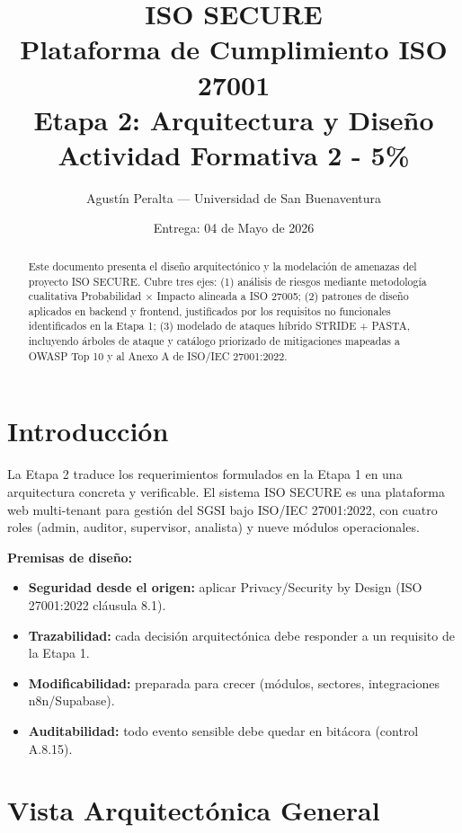 \documentclass[12pt,a4paper,oneside]{article}
\title{
  {\Huge \textbf{ISO SECURE}}\\
  {\LARGE Plataforma de Cumplimiento ISO 27001}\\[2ex]
  {\Large \textcolor{accent}{Etapa 2: Arquitectura y Diseño}}\\[1ex]
  {\small Actividad Formativa 2 - 5\%}
}
\author{Agustín Peralta --- Universidad de San Buenaventura}
\date{Entrega: 04 de Mayo de 2026}
\begin{document}
\maketitle

\begin{abstract}
Este documento presenta el diseño arquitectónico y la modelación de amenazas del proyecto ISO SECURE. Cubre tres ejes: (1) análisis de riesgos mediante metodología cualitativa Probabilidad × Impacto alineada a ISO 27005; (2) patrones de diseño aplicados en backend y frontend, justificados por los requisitos no funcionales identificados en la Etapa 1; (3) modelado de ataques híbrido STRIDE + PASTA, incluyendo árboles de ataque y catálogo priorizado de mitigaciones mapeadas a OWASP Top 10 y al Anexo A de ISO/IEC 27001:2022.
\end{abstract}

\tableofcontents
\newpage

\section{Introducción}

La Etapa 2 traduce los requerimientos formulados en la Etapa 1 en una arquitectura concreta y verificable. El sistema ISO SECURE es una plataforma web multi-tenant para gestión del SGSI bajo ISO/IEC 27001:2022, con cuatro roles (admin, auditor, supervisor, analista) y nueve módulos operacionales.

\textbf{Premisas de diseño:}
\begin{itemize}[leftmargin=*]
  \item \textbf{Seguridad desde el origen:} aplicar Privacy/Security by Design (ISO 27001:2022 cláusula 8.1).
  \item \textbf{Trazabilidad:} cada decisión arquitectónica debe responder a un requisito de la Etapa 1.
  \item \textbf{Modificabilidad:} preparada para crecer (módulos, sectores, integraciones n8n/Supabase).
  \item \textbf{Auditabilidad:} todo evento sensible debe quedar en bitácora (control A.8.15).
\end{itemize}

\section{Vista Arquitectónica General}
\end{document}
